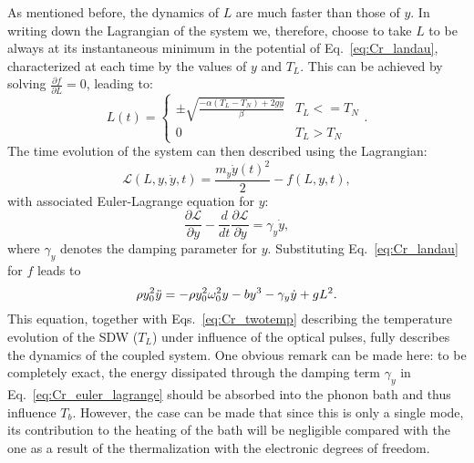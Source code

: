 As mentioned before, the dynamics of $L$ are much faster than those of $y$.
In writing down the Lagrangian of the system we, therefore, choose to take $L$ to be always at its instantaneous minimum in the potential of Eq.~\eqref{eq:Cr_landau}, characterized at each time by the values of $y$ and $T_L$.
This can be achieved by solving $\frac{\partial f}{\partial L} = 0$, leading to:
\begin{equation}
	\label{eq:Cr_L0}
	L(t) =
	\begin{cases}
		\pm \sqrt{\frac{- \alpha (T_L - T_N) + 2 g y}{\beta}} & T_L <= T_N\\
		0 & T_L > T_N
	\end{cases}.
\end{equation}
The time evolution of the system can then described using the Lagrangian:
\begin{equation}
    \mathcal{L}(L, y, \dot{y}, t) = \frac{m_y \dot{y}(t)^2}{2} - f(L, y, t),
\end{equation}
with associated Euler-Lagrange equation for $y$:
\begin{equation}
    \frac{\partial \mathcal{L}}{\partial y} - \frac{d}{dt}\frac{\partial \mathcal{L}}{\partial \dot{y}} = \gamma_y \dot{y},
\end{equation}
where $\gamma_y$ denotes the damping parameter for $y$.
Substituting Eq.~\eqref{eq:Cr_landau} for $f$ leads to 
\begin{equation}
	\label{eq:Cr_euler_lagrange}
	    \rho y_0^2 \Ddot{y} = -\rho y_0^2 \omega_0^2 y  - b y^3 - \gamma_y \dot{y} + gL^2.
\end{equation}
This equation, together with Eqs.~\eqref{eq:Cr_twotemp} describing the temperature evolution of the SDW ($T_L$) under influence of the optical pulses, fully describes the dynamics of the coupled system.
One obvious remark can be made here: to be completely exact, the energy dissipated through the damping term $\gamma_y$ in Eq.~\eqref{eq:Cr_euler_lagrange} should be absorbed into the phonon bath and thus influence $T_b$.
However, the case can be made that since this is only a single mode, its contribution to the heating of the bath will be negligible compared with the one as a result of the thermalization with the electronic degrees of freedom.

